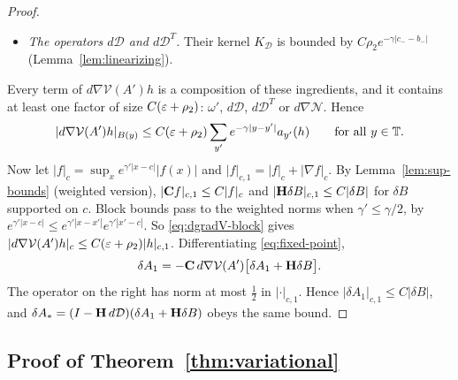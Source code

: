 \begin{proof}
\begin{itemize}
\item \emph{The operators $d\mathcal D$ and $d\mathcal D^T$.} Their kernel $K_{\mathcal D}$ is bounded by $C\rho_2e^{-\gamma|c_--b_-|}$ (Lemma~\ref{lem:linearizing}).
\end{itemize}
Every term of $d\nabla\mathcal V(A')h$ is a composition of these ingredients, and it contains at least one factor of size $C(\varepsilon+\rho_2)$: $\omega'$, $d\mathcal D$, $d\mathcal D^T$ or $d\nabla\mathcal N$. Hence
\begin{equation}\label{eq:dgradV-block}
|d\nabla\mathcal V(A')h|_{B(y)}\le C(\varepsilon+\rho_2)\sum_{y'}e^{-\gamma|y-y'|}a_{y'}(h)\qquad\text{for all }y\in\mathbb T .
\end{equation}
Now let $|f|_c=\sup_xe^{\gamma'|x-c|}|f(x)|$ and $|f|_{c,1}=|f|_c+|\nabla f|_c$. By Lemma~\ref{lem:sup-bounds} (weighted version), $|\mathbf C f|_{c,1}\le C|f|_c$ and $|\mathbf H\delta B|_{c,1}\le C|\delta B|$ for $\delta B$ supported on $c$. Block bounds pass to the weighted norms when $\gamma'\le\gamma/2$, by $e^{\gamma'|x-c|}\le e^{\gamma'|x-x'|}e^{\gamma'|x'-c|}$. So \eqref{eq:dgradV-block} gives $|d\nabla\mathcal V(A')h|_c\le C(\varepsilon+\rho_2)|h|_{c,1}$. Differentiating \eqref{eq:fixed-point},
\[
\delta A_1=-\mathbf C\,d\nabla\mathcal V(A')\big[\delta A_1+\mathbf H\delta B\big].
\]
The operator on the right has norm at most $\frac12$ in $|\cdot|_{c,1}$. Hence $|\delta A_1|_{c,1}\le C|\delta B|$, and $\delta A_*=(I-\mathbf H\,d\mathcal D)(\delta A_1+\mathbf H\delta B)$ obeys the same bound.
\end{proof}

\subsection{Proof of Theorem~\ref{thm:variational}}\label{ss:27.6}

